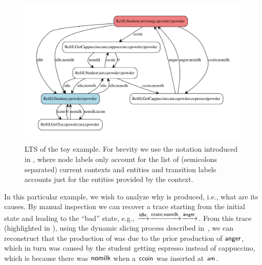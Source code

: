 \begin{figure}
\includegraphics[scale=.3]{./figs/toylts}
\caption{LTS of the toy example. For brevity we use the notation introduced in , where node labels only account for the list of (semicolons separated) current contexts and entities and transition labels accounts just for the entities provided by the context.\label{fig:toylts}}
\end{figure}

In this particular example, we wish to analyze why \bang is produced, i.e., what are its causes. By manual inspection we can recover a trace starting from the initial state and leading to the ``bad'' state, e.g., $\xrightarrow{{\text{\sffamily idle}}}\xrightarrow{{\text{\sffamily ccoin}};{\text{\sffamily nomilk}}}\xrightarrow{{\text{\sffamily anger}}}$. From this trace (highlighted in ), using the dynamic slicing process described in~\cite{DBLP:journals/nc/BrodoBF24}, we can reconstruct that the production of \bang was due to the prior production of ${\text{\sffamily anger}}$, which in turn was caused by the student getting espresso instead of cappuccino, which is because there was ${\text{\sffamily nomilk}}$ when a ${\text{\sffamily ccoin}}$ was inserted at ${\text{\sffamily am}}$.
